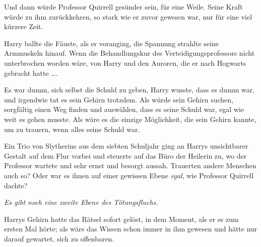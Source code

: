 
Und dann würde Professor Quirrell gesünder sein, für eine Weile. Seine Kraft würde zu ihm zurückkehren, so stark wie er zuvor gewesen war, nur für eine viel kürzere Zeit.

Harry ballte die Fäuste, als er voranging, die Spannung strahlte seine Armmuskeln hinauf. Wenn die Behandlungskur des Verteidigungsprofessors nicht unterbrochen worden wäre, von Harry und den Auroren, die er nach Hogwarts gebracht hatte ….

Es war dumm, sich selbst die Schuld zu geben, Harry wusste, dass es dumm war, und irgendwie tat es sein Gehirn trotzdem. Als würde sein Gehirn suchen, sorgfältig einen Weg finden und auswählen, dass es seine Schuld war, egal wie weit es gehen musste. Als wäre es die einzige Möglichkeit, die sein Gehirn kannte, um zu trauern, wenn alles seine Schuld war.

Ein Trio von Slytherins aus dem siebten Schuljahr ging an Harrys unsichtbarer Gestalt auf dem Flur vorbei und steuerte auf das Büro der Heilerin zu, wo der Professor wartete und sehr ernst und besorgt aussah. Trauerten andere Menschen auch so? Oder war es ihnen auf einer gewissen Ebene \emph{egal}, wie Professor Quirrell dachte?

\emph{Es gibt noch eine zweite Ebene des Tötungsfluchs.}

Harrys Gehirn hatte das Rätsel sofort gelöst, in dem Moment, als er es zum ersten Mal hörte; als wäre das Wissen schon immer in ihm gewesen und hätte nur darauf gewartet, sich zu offenbaren.


